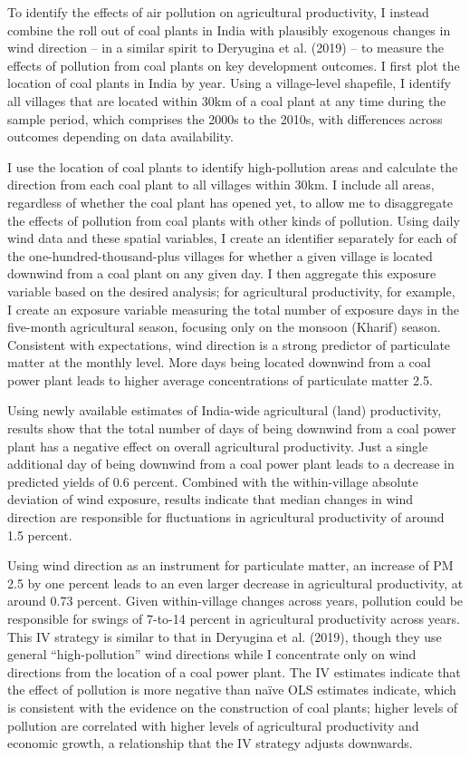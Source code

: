 \documentclass[
]{article}
\begin{document}
To identify the effects of air pollution on agricultural productivity, I instead combine the roll out of coal plants in India with plausibly exogenous changes in wind direction -- in a similar spirit to Deryugina et al. (2019) -- to measure the effects of pollution from coal plants on key development outcomes. I first plot the location of coal plants in India by year. Using a village-level shapefile, I identify all villages that are located within 30km of a coal plant at any time during the sample period, which comprises the 2000s to the 2010s, with differences across outcomes depending on data availability.

I use the location of coal plants to identify high-pollution areas and calculate the direction from each coal plant to all villages within 30km. I include all areas, regardless of whether the coal plant has opened yet, to allow me to disaggregate the effects of pollution from coal plants with other kinds of pollution. Using daily wind data and these spatial variables, I create an identifier separately for each of the one-hundred-thousand-plus villages for whether a given village is located downwind from a coal plant on any given day. I then aggregate this exposure variable based on the desired analysis; for agricultural productivity, for example, I create an exposure variable measuring the total number of exposure days in the five-month agricultural season, focusing only on the monsoon (Kharif) season. Consistent with expectations, wind direction is a strong predictor of particulate matter at the monthly level. More days being located downwind from a coal power plant leads to higher average concentrations of particulate matter 2.5.

Using newly available estimates of India-wide agricultural (land) productivity, results show that the total number of days of being downwind from a coal power plant has a negative effect on overall agricultural productivity. Just a single additional day of being downwind from a coal power plant leads to a decrease in predicted yields of 0.6 percent. Combined with the within-village absolute deviation of wind exposure, results indicate that median changes in wind direction are responsible for fluctuations in agricultural productivity of around 1.5 percent.

Using wind direction as an instrument for particulate matter, an increase of PM 2.5 by one percent leads to an even larger decrease in agricultural productivity, at around 0.73 percent. Given within-village changes across years, pollution could be responsible for swings of 7-to-14 percent in agricultural productivity across years. This IV strategy is similar to that in Deryugina et al. (2019), though they use general ``high-pollution'' wind directions while I concentrate only on wind directions from the location of a coal power plant. The IV estimates indicate that the effect of pollution is more negative than naïve OLS estimates indicate, which is consistent with the evidence on the construction of coal plants; higher levels of pollution are correlated with higher levels of agricultural productivity and economic growth, a relationship that the IV strategy adjusts downwards.
\end{document}
